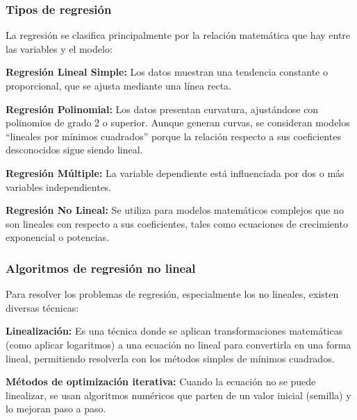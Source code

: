 \subsubsection{Tipos de regresión}
\label{subsub:tipos_regresion}

La regresión \cite{Chapra2015} se clasifica principalmente por la relación matemática que hay entre las variables y el modelo:

\textbf{Regresión Lineal Simple:} Los datos muestran una tendencia constante o proporcional, que se ajusta mediante una línea recta.

\textbf{Regresión Polinomial:} Los datos presentan curvatura, ajustándose con polinomios de grado 2 o superior. Aunque generan curvas, se consideran modelos \enquote{lineales por mínimos cuadrados} porque la relación respecto a sus coeficientes desconocidos sigue siendo lineal.

\textbf{Regresión Múltiple:} La variable dependiente está influenciada por dos o más variables independientes.

\textbf{Regresión No Lineal:} Se utiliza para modelos matemáticos complejos que no son lineales con respecto a sus coeficientes, tales como ecuaciones de crecimiento exponencial o potencias.

\subsubsection{Algoritmos de regresión no lineal}
Para resolver los problemas de regresión, especialmente los no lineales, existen diversas técnicas:

\textbf{Linealización:} Es una técnica donde se aplican transformaciones matemáticas (como aplicar logaritmos) a una ecuación no lineal para convertirla en una forma lineal, permitiendo resolverla con los métodos simples de mínimos cuadrados.

\textbf{Métodos de optimización iterativa:} Cuando la ecuación no se puede linealizar, se usan algoritmos numéricos que parten de un valor inicial (semilla) y lo mejoran paso a paso.

